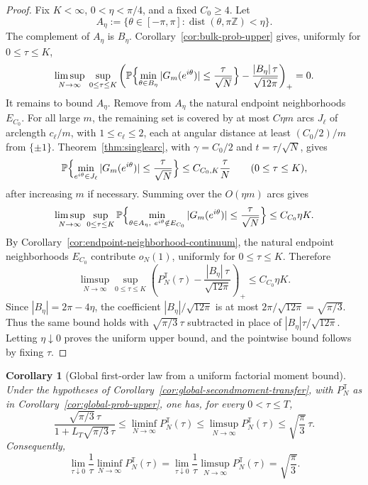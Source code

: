 \documentclass[11pt]{amsart}
\numberwithin{equation}{section}
\newtheorem{corollary}[theorem]{Corollary}
\theoremstyle{definition}
\theoremstyle{remark}
\newcommand{\T}{\mathbb T}
\newcommand{\Prob}{\mathbb P}
\newcommand{\dist}{\operatorname{dist}}
\begin{document}
\begin{proof}
Fix \(K<\infty\), \(0<\eta<\pi/4\), and a fixed \(C_0\ge4\).  Let
\[
  A_\eta:=\{\theta\in[-\pi,\pi]:\dist(\theta,\pi\mathbb Z)<\eta\}.
\]
The complement of \(A_\eta\) is \(B_\eta\).  Corollary~\ref{cor:bulk-prob-upper}
gives, uniformly for \(0\le\tau\le K\),
\[
  \limsup_{N\to\infty}\;
  \sup_{0\le\tau\le K}
  \left(
    \Prob\Bigl\{
      \min_{\theta\in B_\eta}|G_m(e^{i\theta})|
      \le \frac{\tau}{\sqrt N}
    \Bigr\}
    -\frac{|B_\eta|\,\tau}{\sqrt{12\pi}}
  \right)_+
  =0 .
\]
It remains to bound \(A_\eta\).  Remove from \(A_\eta\) the natural endpoint
neighborhoods \(E_{C_0}\).  For all large \(m\), the remaining set is covered by
at most \(C\eta m\) arcs \(J_\ell\) of arclength \(c_\ell/m\), with
\(1\le c_\ell\le2\), each at angular distance at least \((C_0/2)/m\) from
\(\{\pm1\}\).  Theorem~\ref{thm:singlearc}, with
\(\gamma=C_0/2\) and \(t=\tau/\sqrt N\), gives
\[
  \Prob\Bigl\{
    \min_{e^{i\theta}\in J_\ell}|G_m(e^{i\theta})|
    \le \frac{\tau}{\sqrt N}
  \Bigr\}
  \le C_{C_0,K}\frac{\tau}{N}
  \qquad(0\le\tau\le K),
\]
after increasing \(m\) if necessary.  Summing over the \(O(\eta m)\) arcs gives
\[
  \limsup_{N\to\infty}\sup_{0\le\tau\le K}
  \Prob\Bigl\{
    \min_{\theta\in A_\eta,\ e^{i\theta}\notin E_{C_0}}
      |G_m(e^{i\theta})|
    \le \frac{\tau}{\sqrt N}
  \Bigr\}
  \le C_{C_0}\eta K .
\]
By Corollary~\ref{cor:endpoint-neighborhood-continuum}, the natural endpoint
neighborhoods \(E_{C_0}\) contribute \(o_N(1)\), uniformly for
\(0\le\tau\le K\).  Therefore
\[
  \limsup_{N\to\infty}
  \sup_{0\le\tau\le K}
  \left(
    P_N^{\T}(\tau)
    -\frac{|B_\eta|\,\tau}{\sqrt{12\pi}}
  \right)_+
  \le C_{C_0}\eta K .
\]
Since \(|B_\eta|=2\pi-4\eta\), the coefficient
\(|B_\eta|/\sqrt{12\pi}\) is at most \(2\pi/\sqrt{12\pi}=\sqrt{\pi/3}\).
Thus the same bound holds with
\(\sqrt{\pi/3}\,\tau\) subtracted in place of
\(|B_\eta|\tau/\sqrt{12\pi}\).  Letting \(\eta\downarrow0\) proves the uniform
upper bound, and the pointwise bound follows by fixing \(\tau\).
\end{proof}

\begin{corollary}[Global first-order law from a uniform factorial moment bound]
\label{cor:global-firstorder-sandwich}
Under the hypotheses of Corollary~\ref{cor:global-secondmoment-transfer}, with
\(P_N^{\T}\) as in Corollary~\ref{cor:global-prob-upper}, one has, for every
\(0<\tau\le T\),
\[
  \frac{\sqrt{\pi/3}\,\tau}
       {1+L_T\sqrt{\pi/3}\,\tau}
  \le
  \liminf_{N\to\infty}P_N^{\T}(\tau)
  \le
  \limsup_{N\to\infty}P_N^{\T}(\tau)
  \le
  \sqrt{\frac{\pi}{3}}\,\tau .
\]
Consequently,
\[
  \lim_{\tau\downarrow0}
  \frac{1}{\tau}\liminf_{N\to\infty}P_N^{\T}(\tau)
  =
  \lim_{\tau\downarrow0}
  \frac{1}{\tau}\limsup_{N\to\infty}P_N^{\T}(\tau)
  =
  \sqrt{\frac{\pi}{3}}.
\]
\end{corollary}
\end{document}

